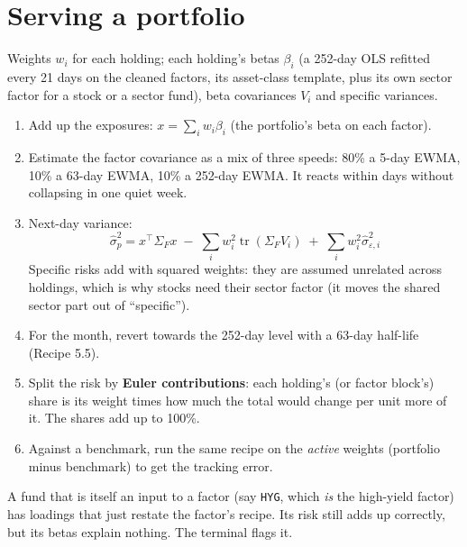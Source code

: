 \documentclass[11pt,a4paper]{article}
\begin{document}
\section{Serving a portfolio}

\begin{ingredients}
Weights $w_i$ for each holding; each holding's betas $\beta_i$ (a 252-day OLS refitted
every 21 days on the cleaned factors, its asset-class template, plus its own sector
factor for a stock or a sector fund), beta covariances $V_i$ and specific variances.
\end{ingredients}

\begin{method}
\begin{enumerate}[leftmargin=1.4em]
  \item Add up the exposures: $x = \sum_i w_i\beta_i$ (the portfolio's beta on each factor).
  \item Estimate the factor covariance as a mix of three speeds: 80\% a 5-day EWMA, 10\% a 63-day EWMA, 10\% a 252-day EWMA. It reacts within days without collapsing in one quiet week.
  \item Next-day variance:
  \[
    \hat\sigma^2_p = x^{\top}\Sigma_F x \;-\; \sum_i w_i^2\operatorname{tr}(\Sigma_F V_i) \;+\; \sum_i w_i^2\hat\sigma^2_{\varepsilon,i}
  \]
  Specific risks add with squared weights: they are assumed unrelated across holdings, which is why stocks need their sector factor (it moves the shared sector part out of ``specific'').
  \item For the month, revert towards the 252-day level with a 63-day half-life (Recipe 5.5).
  \item Split the risk by \textbf{Euler contributions}: each holding's (or factor block's) share is its weight times how much the total would change per unit more of it. The shares add up to 100\%.
  \item Against a benchmark, run the same recipe on the \emph{active} weights (portfolio minus benchmark) to get the tracking error.
\end{enumerate}
\end{method}

\begin{warn}
A fund that is itself an input to a factor (say \texttt{HYG}, which \emph{is} the
high-yield factor) has loadings that just restate the factor's recipe. Its risk still
adds up correctly, but its betas explain nothing. The terminal flags it.
\end{warn}
\end{document}
